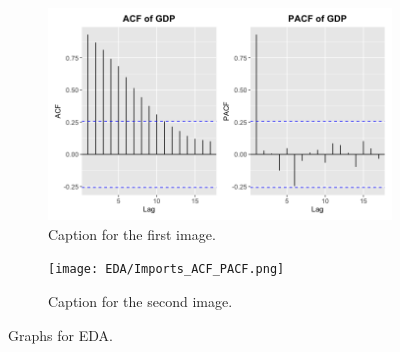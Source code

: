 \documentclass[11pt]{article}
\begin{document}
\begin{figure}[htbp]
  \begin{subfigure}[b]{0.48\textwidth}
    \centering
    \includegraphics[width=\linewidth]{EDA/GDP_ACF_PACF.png} %
    \caption{Caption for the first image.}
    \label{fig:side:a}
  \end{subfigure}
  \hfill
  \begin{subfigure}[b]{0.48\textwidth}
    \centering
    \texttt{[image: EDA/Imports\_ACF\_PACF.png]} %
    \caption{Caption for the second image.}
    \label{fig:side:b}
  \end{subfigure}

  \label{fig:side-by-side}

  \caption{Graphs for EDA.}
\end{figure}
\end{document}
